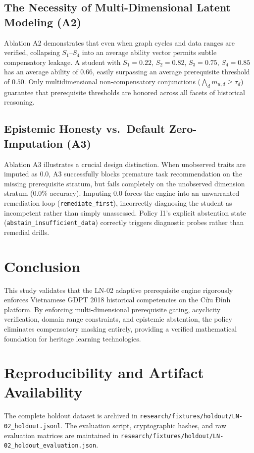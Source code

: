 \documentclass[11pt,a4paper]{article}
\begin{document}
\subsection{The Necessity of Multi-Dimensional Latent Modeling (A2)}
Ablation A2 demonstrates that even when graph cycles and data ranges are verified, collapsing $S_1$--$S_4$ into an average ability vector permits subtle compensatory leakage. A student with $S_1 = 0.22$, $S_2 = 0.82$, $S_3 = 0.75$, $S_4 = 0.85$ has an average ability of $0.66$, easily surpassing an average prerequisite threshold of $0.50$. Only multidimensional non-compensatory conjunctions ($\bigwedge_{d} m_{u, d} \ge \tau_d$) guarantee that prerequisite thresholds are honored across all facets of historical reasoning.

\subsection{Epistemic Honesty vs.\ Default Zero-Imputation (A3)}
Ablation A3 illustrates a crucial design distinction. When unobserved traits are imputed as $0.0$, A3 successfully blocks premature task recommendation on the missing prerequisite stratum, but fails completely on the unobserved dimension stratum ($0.0\%$ accuracy). Imputing $0.0$ forces the engine into an unwarranted remediation loop (\texttt{remediate\_first}), incorrectly diagnosing the student as incompetent rather than simply unassessed. Policy I1's explicit abstention state (\texttt{abstain\_insufficient\_data}) correctly triggers diagnostic probes rather than remedial drills.

\section{Conclusion}
This study validates that the LN-02 adaptive prerequisite engine rigorously enforces Vietnamese GDPT 2018 historical competencies on the Cửu Đỉnh platform. By enforcing multi-dimensional prerequisite gating, acyclicity verification, domain range constraints, and epistemic abstention, the policy eliminates compensatory masking entirely, providing a verified mathematical foundation for heritage learning technologies.

\section*{Reproducibility and Artifact Availability}
The complete holdout dataset is archived in \texttt{research/fixtures/holdout/LN-02\_holdout.jsonl}. The evaluation script, cryptographic hashes, and raw evaluation matrices are maintained in \texttt{research/fixtures/holdout/LN-02\_holdout\_evaluation.json}.
\end{document}
